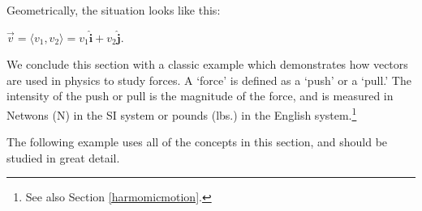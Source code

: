 \documentclass{ximera}
\begin{document}
Geometrically, the situation looks like this:


\begin{center}

\vspace{0.5em}

$\displaystyle
\overrightarrow{v}
=\langle v_1,v_2\rangle
=
v_1\hat{\mathbf{i}}
+
v_2\hat{\mathbf{j}}.
$

\end{center}

We conclude this section with a classic example which demonstrates how vectors are used in physics to study forces.  A `force' is defined as a `push' or a `pull.'   The intensity of the push or pull is the magnitude of the force, and is  measured in Netwons (N) in the SI system or pounds (lbs.)$\!$ in the English system.\footnote{See also Section \ref{harmomicmotion}.} 

 

 The following example uses all of the concepts in this section, and should be studied in great detail.
\end{document}
